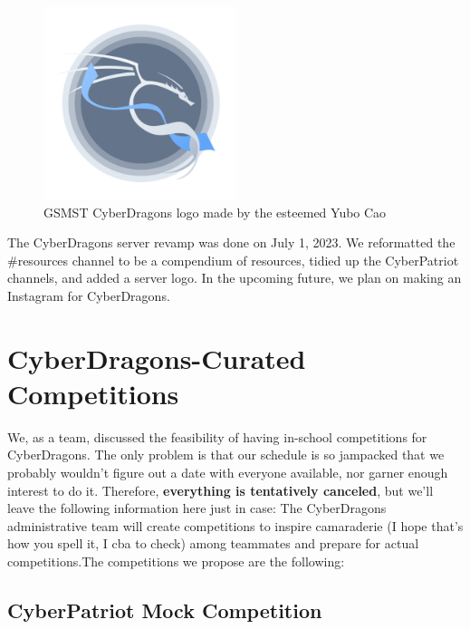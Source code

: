 \documentclass[
  letterpaper,
  DIV=11,
  numbers=noendperiod]{scrartcl}
\begin{document}
\begin{figure}

{\centering \includegraphics[width=0.5\textwidth,height=\textheight]{CyberDragons.png}

}

\caption{GSMST CyberDragons logo made by the esteemed Yubo Cao}

\end{figure}

The CyberDragons server revamp was done on July 1, 2023. We reformatted the \#resources channel to be a compendium of resources, tidied up the CyberPatriot channels, and added a server logo. In the upcoming future, we plan on making an Instagram for CyberDragons.

\newpage{}

\hypertarget{cyberdragons-curated-competitions}{%
\section{CyberDragons-Curated
Competitions}\label{cyberdragons-curated-competitions}}

We, as a team, discussed the feasibility of having in-school competitions for CyberDragons. The only problem is that our schedule is so jampacked that we probably wouldn't figure out a date with everyone available, nor garner enough interest to do it. Therefore, \textbf{everything is tentatively canceled}, but we'll leave the following information here just in case: 
The CyberDragons administrative team will create competitions to inspire
camaraderie (I hope that's how you spell it, I cba to check) among
teammates and prepare for actual competitions.The competitions we
propose are the following:

\hypertarget{cyberpatriot-mock-competition}{%
\subsection{CyberPatriot Mock
Competition}\label{cyberpatriot-mock-competition}}
\end{document}
